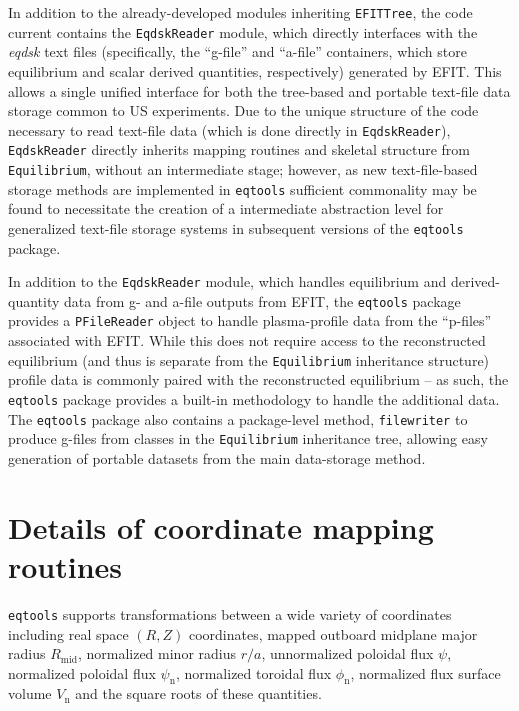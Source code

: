 \documentclass[12pt,floatfix,showpacs]{revtex4-1}
\newcommand{\gnote}[1]{\marginpar{\scriptsize\textcolor{red}{#1}}}
\newcommand{\eqtools}{\texttt{eqtools}\xspace}
\begin{document}
In addition to the already-developed modules inheriting \verb|EFITTree|, the code current contains the \verb|EqdskReader| module, which directly interfaces with the \emph{eqdsk} text files (specifically, the ``g-file'' and ``a-file'' containers, which store equilibrium and scalar derived quantities, respectively) generated by EFIT.\gnote{cite?}  This allows a single unified interface for both the tree-based and portable text-file data storage common to US experiments.\gnote{expand?  other countries?}  Due to the unique structure of the code necessary to read text-file data (which is done directly in \verb|EqdskReader|), \verb|EqdskReader| directly inherits mapping routines and skeletal structure from \verb|Equilibrium|, without an intermediate stage; however, as new text-file-based storage methods are implemented in \eqtools sufficient commonality may be found to necessitate the creation of a intermediate abstraction level for generalized text-file storage systems in subsequent versions of the \eqtools package.

In addition to the \verb|EqdskReader| module, which handles equilibrium and derived-quantity data from g- and a-file outputs from EFIT, the \eqtools package provides a \verb|PFileReader| object to handle plasma-profile data from the ``p-files'' associated with EFIT.  While this does not require access to the reconstructed equilibrium (and thus is separate from the \verb|Equilibrium| inheritance structure) profile data is commonly paired with the reconstructed equilibrium -- as such, the \eqtools package provides a built-in methodology to handle the additional data.  The \eqtools package also contains a package-level method, \verb|filewriter|\gnote{check naming!} to produce g-files from classes in the \verb|Equilibrium| inheritance tree, allowing easy generation of portable datasets from the main data-storage method.\gnote{reword?}

\section{Details of coordinate mapping routines}\label{sec:algo}
\eqtools supports transformations between a wide variety of coordinates including real space $(R, Z)$ coordinates, mapped outboard midplane major radius $R_{\text{mid}}$, normalized minor radius $r/a$, unnormalized poloidal flux $\psi$, normalized poloidal flux $\psi_{\text{n}}$, normalized toroidal flux $\phi_{\text{n}}$, normalized flux surface volume $V_{\text{n}}$ and the square roots of these quantities.
\end{document}
